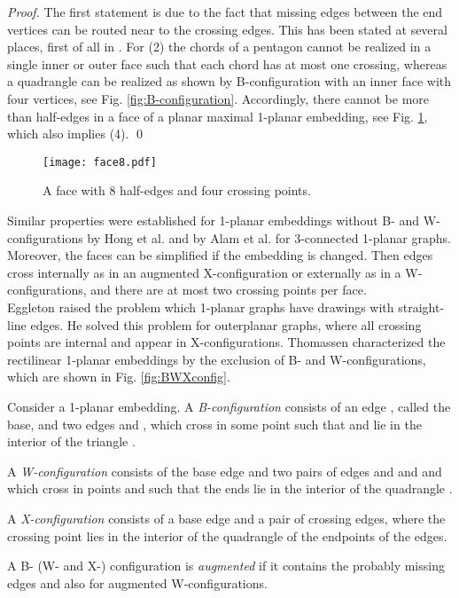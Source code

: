 \documentclass[runningheads]{llncs}
\begin{document}
\begin{proof}
The first statement is due to the fact that  missing edges between
the end vertices can be routed near to the crossing edges. This has
been stated at several places, first of all in \cite{bhw-1og-84}.
For (2) the chords of a pentagon cannot be realized in a single
inner or outer face such that each chord has at most one crossing,
whereas a quadrangle can be realized as shown by  B-configuration
with an inner face with four vertices, see Fig.
\ref{fig:B-configuration}. Accordingly, there cannot be more than
 half-edges in a face of a planar maximal 1-planar embedding, see
Fig. \ref{fig:face-8}, which also implies (4). \qed
\end{proof}


\begin{figure}
   \begin{center}
     \texttt{[image: face8.pdf]}
     \caption{A face with 8 half-edges and four crossing points.
     \label{fig:face-8}}
   \end{center}
\end{figure}



Similar properties  were established
 for 1-planar embeddings without B- and W-configurations by Hong et al.
\cite{help-ft1pg-12} and by Alam et al. \cite{abk-sld3c-13} for
3-connected 1-planar graphs. Moreover, the faces can be simplified
if the embedding is changed. Then edges cross internally as in an
augmented X-configuration or externally as in a W-configurations,
and there
are at most two crossing points per face.\\


Eggleton \cite{e-rdg-86} raised the problem which  1-planar graphs
have drawings with straight-line edges. He solved this problem for
outerplanar graphs, where all crossing points are internal and
appear in X-configurations. Thomassen \cite{t-rdg-88}  characterized
the rectilinear 1-planar embeddings  by the exclusion of B- and
W-configurations, which are shown in Fig. \ref{fig:BWXconfig}.





\begin{definition}
Consider a 1-planar embedding.
 A \textit{B-configuration}
 consists of an edge , called the base, and
two edges  and , which cross in some point  such
that  and  lie in the interior of the triangle .

A \textit{W-configuration}  consists of the base
edge  and two pairs of edges  and  and  and  which cross in points  and  such that the
ends  lie in the interior of the quadrangle .

A \textit{X-configuration} consists of a base edge and a pair of
crossing edges, where the crossing point lies in the interior of the
quadrangle of the endpoints of the edges.


A B- (W- and X-) configuration is \textit{augmented} if it contains
the probably missing  edges  and also
 for augmented W-configurations.
\end{definition}
\end{document}
